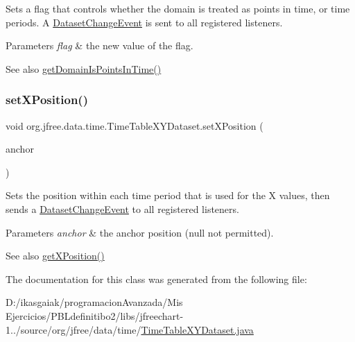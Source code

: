 Sets a flag that controls whether the domain is treated as \textquotesingle{}points in time\textquotesingle{}, or time periods. A \mbox{\hyperlink{}{Dataset\+Change\+Event}} is sent to all registered listeners.


\begin{DoxyParams}{Parameters}
{\em flag} & the new value of the flag.\\
\hline
\end{DoxyParams}
\begin{DoxySeeAlso}{See also}
\mbox{\hyperlink{classorg_1_1jfree_1_1data_1_1time_1_1_time_table_x_y_dataset_a2fee635aed27d459cef92926f96cbe37}{get\+Domain\+Is\+Points\+In\+Time()}} 
\end{DoxySeeAlso}
\mbox{\label{classorg_1_1jfree_1_1data_1_1time_1_1_time_table_x_y_dataset_a337c2e5697dc824c58215035b441d338}} 
\subsubsection{\texorpdfstring{set\+X\+Position()}{setXPosition()}}
{\footnotesize\ttfamily void org.\+jfree.\+data.\+time.\+Time\+Table\+X\+Y\+Dataset.\+set\+X\+Position (\begin{DoxyParamCaption}\item[{\mbox{\hyperlink{classorg_1_1jfree_1_1data_1_1time_1_1_time_period_anchor}{Time\+Period\+Anchor}}}]{anchor }\end{DoxyParamCaption})}

Sets the position within each time period that is used for the X values, then sends a \mbox{\hyperlink{}{Dataset\+Change\+Event}} to all registered listeners.


\begin{DoxyParams}{Parameters}
{\em anchor} & the anchor position ({\ttfamily null} not permitted).\\
\hline
\end{DoxyParams}
\begin{DoxySeeAlso}{See also}
\mbox{\hyperlink{classorg_1_1jfree_1_1data_1_1time_1_1_time_table_x_y_dataset_a8346f001c677400629be5c93775dfeb8}{get\+X\+Position()}} 
\end{DoxySeeAlso}


The documentation for this class was generated from the following file\+:\begin{DoxyCompactItemize}
\item 
D\+:/ikasgaiak/programacion\+Avanzada/\+Mis Ejercicios/\+P\+B\+Ldefinitibo2/libs/jfreechart-\/1../source/org/jfree/data/time/\mbox{\hyperlink{_time_table_x_y_dataset_8java}{Time\+Table\+X\+Y\+Dataset.\+java}}\end{DoxyCompactItemize}
